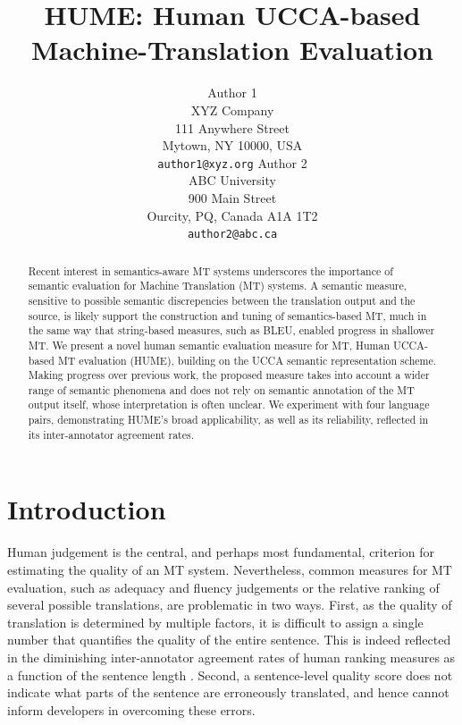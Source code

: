 \documentclass[11pt]{article}
\title{HUME: Human UCCA-based Machine-Translation Evaluation}
\author{Author 1\\
	    XYZ Company\\
	    111 Anywhere Street\\
	    Mytown, NY 10000, USA\\
	    {\tt author1@xyz.org}
	  \And
	Author 2\\
  	ABC University\\
  	900 Main Street\\
  	Ourcity, PQ, Canada A1A 1T2\\
  {\tt author2@abc.ca}}
\date{}
\begin{document}
\maketitle

\begin{abstract}
  
  Recent interest in semantics-aware MT systems underscores the importance of
  semantic evaluation for Machine Translation (MT) systems. 
  A semantic measure, sensitive to possible semantic discrepencies
  between the translation output and the source, is likely support the construction
  and tuning of semantics-based MT, much in the same way that string-based measures,
  such as BLEU, enabled progress in shallower MT.
  We present a novel human semantic evaluation measure for MT, Human
  UCCA-based MT evaluation (HUME), building on the UCCA semantic representation scheme.
  Making progress over previous work, the proposed measure takes into account
  a wider range of semantic phenomena and does not rely on semantic annotation
  of the MT output itself, whose interpretation is often unclear.
  We experiment with four language pairs, demonstrating HUME's broad applicability,
  as well as its reliability, reflected in its inter-annotator agreement rates.

\end{abstract}


\section{Introduction}\label{sec:intro}

Human judgement is the central, and perhaps most fundamental, criterion for
estimating the quality of an MT system.
Nevertheless, common measures for MT evaluation, such as adequacy and fluency judgements
or the relative ranking of several possible translations, are problematic in two ways.
First, as the quality of translation is determined by multiple factors, it is difficult
to assign a single number that quantifies the quality of the entire sentence. This
is indeed reflected in the diminishing inter-annotator agreement rates of human ranking measures
as a function of the sentence length \cite{Bojar:2011}.
Second, a sentence-level quality score does not indicate what parts of the sentence
are erroneously translated, and hence cannot inform developers in overcoming these errors.
\end{document}
